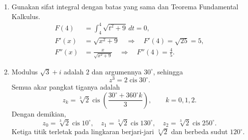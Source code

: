 \documentclass[11pt,a4paper]{article}
\begin{document}
\begin{enumerate}
    \item Gunakan sifat integral dengan batas yang sama dan Teorema Fundamental Kalkulus.
    \begin{align*}
        F(4)&=\int_4^4\sqrt{t^2+9}\,dt=\boxed{0},\\
        F'(x)&=\sqrt{x^2+9}
            \quad\Longrightarrow\quad F'(4)=\sqrt{25}=\boxed{5},\\
        F''(x)&=\frac{x}{\sqrt{x^2+9}}
            \quad\Longrightarrow\quad F''(4)=\boxed{\frac45}.
    \end{align*}

    \item Modulus $\sqrt3+i$ adalah $2$ dan argumennya $30^\circ$, sehingga
    \[
        z^3=2\operatorname{cis}30^\circ.
    \]
    Semua akar pangkat tiganya adalah
    \[
        z_k=\sqrt[3]{2}\operatorname{cis}
            \left(\frac{30^\circ+360^\circ k}{3}\right),\qquad k=0,1,2.
    \]
    Dengan demikian,
    \[
        \boxed{z_0=\sqrt[3]{2}\operatorname{cis}10^\circ,\quad
        z_1=\sqrt[3]{2}\operatorname{cis}130^\circ,\quad
        z_2=\sqrt[3]{2}\operatorname{cis}250^\circ}.
    \]
    Ketiga titik terletak pada lingkaran berjari-jari $\sqrt[3]{2}$ dan berbeda sudut $120^\circ$.
    \begin{center}
    \end{center}


\end{enumerate}
\end{document}
